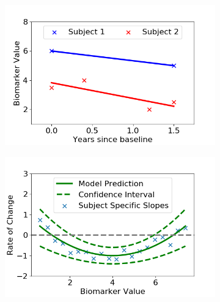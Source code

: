 \begin{figure}
 \centering
 
 \begin{subfigure}{0.47\textwidth}
    \includegraphics[width=\textwidth]{images/demDiagramPlots/fig1_linReg.png}
    \caption{}
    \label{fig:pcaDemDiagramA}
 \end{subfigure}
 \begin{subfigure}{0.47\textwidth}
     \includegraphics[width=\textwidth]{images/demDiagramPlots/fig2_GP.png}
    \caption{}
    \label{fig:pcaDemDiagramB}
 \end{subfigure}
 \vspace{1em}
 

\end{figure}
